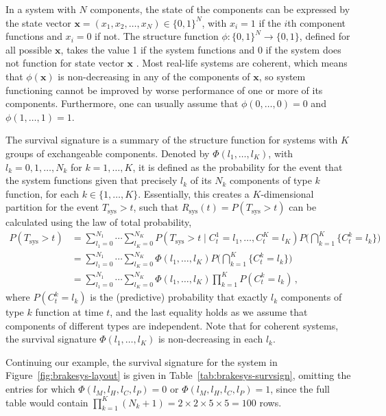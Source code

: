 \documentclass[authoryear]{elsarticle}
\renewcommand{\vec}[1]{{\bm#1}}
\newcommand{\Tsys}{T_\text{sys}}
\newcommand{\Rsys}{R_\text{sys}}
\begin{document}
In a system with $N$ components, the state of the components can be expressed by the state vector
$\vec{x} = (x_1,x_2,\ldots,x_N) \in \{0,1\}^N$,
with $x_i=1$ if the $i$th component functions and $x_i=0$ if not.
The structure function $\phi : \{0,1\}^N \rightarrow \{0,1\}$, defined for all possible $\vec{x}$,
takes the value 1 if the system functions and 0 if the system does not function for state vector $\vec{x}$ \citep{BP75}.
Most real-life systems are coherent,
which means that $\phi(\vec{x})$ is non-decreasing in any of the components of $\vec{x}$,
so system functioning cannot be improved by worse performance of one or more of its components.
Furthermore, one can usually assume that $\phi(0, \ldots, 0) = 0$ and $\phi(1, \ldots, 1) = 1$.

The survival signature \citep{2012:survsign} is a summary of the structure function
for systems with $K$ groups of exchangeable components.
Denoted by $\Phi(l_1,\ldots,l_K)$, with $l_k=0,1,\ldots,N_k$ for $k=1,\ldots,K$,
it is defined as the probability for the event that the system functions
given that precisely $l_k$ of its $N_k$ components of type $k$ function, for each $k\in \{1,\ldots,K\}$.
Essentially, this creates a $K$-dimensional partition for the event $\Tsys > t$,
such that $\Rsys(t) = P(\Tsys > t)$ can be calculated using the law of total probability,
\begin{align}
P(\Tsys > t) &= \sum_{l_1=0}^{N_1} \cdots \sum_{l_K=0}^{N_K} P(\Tsys > t \mid C^1_t = l_1,\ldots, C^K_t = l_K)
                                                                                  P\Big( \bigcap_{k=1}^K \{ C^k_t = l_k\} \Big) \nonumber\\
             &= \sum_{l_1=0}^{N_1} \cdots \sum_{l_K=0}^{N_K} \Phi(l_1,\ldots,l_K) P\Big( \bigcap_{k=1}^K \{ C^k_t = l_k\} \Big) \nonumber\\
             &= \sum_{l_1=0}^{N_1} \cdots \sum_{l_K=0}^{N_K} \Phi(l_1,\ldots,l_K) \prod_{k=1}^K P(C^k_t = l_k)\,,
\label{eq:sysrel-survsign}
\end{align}
where $P(C^k_t = l_k)$ is the (predictive) probability that exactly $l_k$ components of type $k$ function at time $t$,
and the last equality holds as we assume that components of different types are independent.
Note that for coherent systems, the survival signature $\Phi(l_1,\ldots,l_K)$ is non-decreasing in each $l_k$.

Continuing our example,
the survival signature for the system in Figure~\ref{fig:brakesys-layout} is given in Table~\ref{tab:brakesys-survsign},
omitting the entries for which $\Phi(l_M, l_H, l_C, l_P) = 0$ or $\Phi(l_M, l_H, l_C, l_P) = 1$,
since the full table would contain $\prod_{k=1}^K (N_k + 1) = 2 \times 2 \times 5 \times 5 = 100$ rows.
\end{document}
